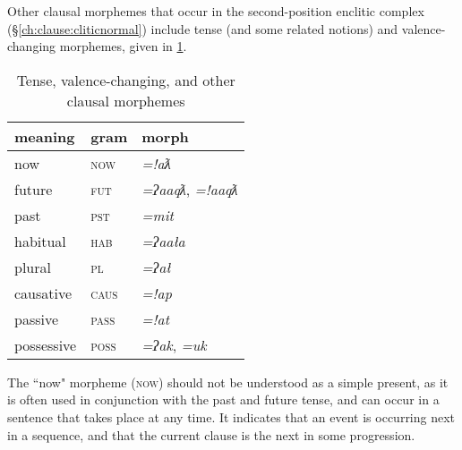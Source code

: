 Other clausal morphemes that occur in the second-position enclitic complex (\S\ref{ch:clause:cliticnormal}) include tense (and some related notions) and valence-changing morphemes, given in \cref{table:tense}.

\begin{table}[ht]
\centering
\caption{Tense, valence-changing, and other clausal morphemes}
\label{table:tense}
\begin{tabular}{lll}
meaning                        & gram               & morph                        \\ \hline
\multicolumn{1}{|l|}{now}      & \multicolumn{1}{l|}{\textsc{now}}   & \multicolumn{1}{l|}{\textit{=!aƛ}}     \\ \hline
\multicolumn{1}{|l|}{future}   & \multicolumn{1}{l|}{\textsc{fut}}   & \multicolumn{1}{l|}{\textit{=ʔaaqƛ}, \textit{=!aaqƛ}}   \\ \hline
\multicolumn{1}{|l|}{past}     & \multicolumn{1}{l|}{\textsc{pst}}   & \multicolumn{1}{l|}{\textit{=mit}}     \\ \hline
\multicolumn{1}{|l|}{habitual} & \multicolumn{1}{l|}{\textsc{hab}} & \multicolumn{1}{l|}{\textit{=ʔaała}}    \\ \hline
\multicolumn{1}{|l|}{plural\footnotemark} & \multicolumn{1}{l|}{\textsc{pl}} & \multicolumn{1}{l|}{\textit{=ʔał}}    \\ \hline
\multicolumn{1}{|l|}{causative}  & \multicolumn{1}{l|}{\textsc{caus}} & \multicolumn{1}{l|}{\textit{=!ap}}      \\ \hline
\multicolumn{1}{|l|}{passive\footnotemark}    & \multicolumn{1}{l|}{\textsc{pass}} & \multicolumn{1}{l|}{\textit{=!at}}      \\ \hline
\multicolumn{1}{|l|}{possessive} & \multicolumn{1}{l|}{\textsc{poss}} & \multicolumn{1}{l|}{\textit{=ʔak}, \textit{=uk}} \\ \hline
\end{tabular}
\end{table}

\addtocounter{footnote}{-1}
\addtocounter{footnote}{1}

The ``now" morpheme (\textsc{now}) should not be understood as a simple present, as it is often used in conjunction with the past and future tense, and can occur in a sentence that takes place at any time. It indicates that an event is occurring next in a sequence, and that the current clause is the next in some progression.

